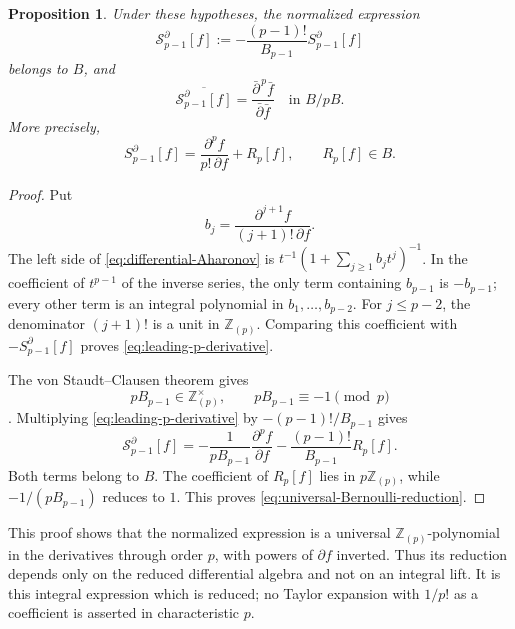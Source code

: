 \documentclass[10pt,a4paper]{amsart}
\newtheorem{prop}[thm]{Proposition}
\numberwithin{equation}{section}
\begin{document}
\begin{prop}\label{prop:Bernoulli-reduction}
Under these hypotheses, the normalized expression
\[
\mathcal S_{p-1}^\partial[f]
:=-\frac{(p-1)!}{B_{p-1}}S_{p-1}^\partial[f]
\]
belongs to $B$, and
\begin{equation}\label{eq:universal-Bernoulli-reduction}
\overline{\mathcal S_{p-1}^\partial[f]}
=\frac{\bar\partial^{\,p}\bar f}{\bar\partial\bar f}
\quad\text{in } B/pB.
\end{equation}
More precisely,
\begin{equation}\label{eq:leading-p-derivative}
S_{p-1}^\partial[f]
=\frac{\partial^p f}{p!\,\partial f}+R_p[f],
\qquad R_p[f]\in B.
\end{equation}
\end{prop}

\begin{proof}
Put
\[
b_j=\frac{\partial^{j+1}f}{(j+1)!\,\partial f}.
\]
The left side of \eqref{eq:differential-Aharonov} is
$t^{-1}(1+\sum_{j\geq1}b_jt^j)^{-1}$. In the coefficient of $t^{p-1}$
of the inverse series, the only term containing $b_{p-1}$ is
$-b_{p-1}$; every other term is an integral polynomial in
$b_1,\ldots,b_{p-2}$. For $j\leq p-2$, the denominator $(j+1)!$ is a
unit in $\mathbb Z_{(p)}$. Comparing this coefficient with
$-S_{p-1}^\partial[f]$ proves \eqref{eq:leading-p-derivative}.

The von Staudt--Clausen theorem gives
\begin{equation}\label{eq:Bernoulli-p-unit}
pB_{p-1}\in\mathbb Z_{(p)}^\times,
\qquad pB_{p-1}\equiv-1\pmod p
\end{equation}
\cite[pp.~233--237]{ireland-rosen}. Multiplying
\eqref{eq:leading-p-derivative} by $-(p-1)!/B_{p-1}$ gives
\[
\mathcal S_{p-1}^\partial[f]
=-\frac1{pB_{p-1}}\frac{\partial^p f}{\partial f}
 -\frac{(p-1)!}{B_{p-1}}R_p[f].
\]
Both terms belong to $B$. The coefficient of $R_p[f]$ lies in
$p\mathbb Z_{(p)}$, while $-1/(pB_{p-1})$ reduces to $1$. This proves
\eqref{eq:universal-Bernoulli-reduction}.
\end{proof}

This proof shows that the normalized expression is a universal
$\mathbb Z_{(p)}$-polynomial in the derivatives through order $p$, with
powers of $\partial f$ inverted. Thus its reduction depends only on
the reduced differential algebra and not on an integral lift. It is
this integral expression which is reduced; no Taylor expansion with
$1/p!$ as a coefficient is asserted in characteristic $p$.
\end{document}
